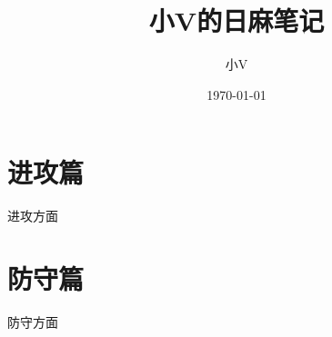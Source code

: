 \documentclass[UTF8,12pt,titlepage,oneside]{ctexbook}
\title{小V的日麻笔记}
\author{小V}
\date{\today}
\begin{document}
\maketitle
\pagestyle{empty}
\tableofcontents

\pagestyle{fancy}


\cleardoublepage


\cleardoublepage
\chapter{进攻篇}
进攻方面
\cleardoublepage
\chapter{防守篇}
防守方面
\cleardoublepage
\end{document}
